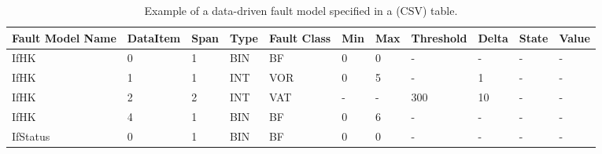 \begin{table}[h]
\begin{center}
\small
\begin{tabular}{|p{1cm}|p{1.6cm}|p{1cm}|p{1cm}|p{1cm}|p{1cm}|p{1cm}|p{1.6cm}|p{1cm}|p{1cm}|p{1cm}|}
\hline
\textbf{Fault Model Name}&\textbf{DataItem}&\textbf{Span}&\textbf{Type}&\textbf{Fault Class}&\textbf{Min}&\textbf{Max}&\textbf{Threshold}&\textbf{Delta}&\textbf{State}&\textbf{Value}\\
\hline
IfHK&0&1&BIN&BF&0&0&-&-&-&-\\
IfHK&1&1&INT&VOR&0&5&-&1&-&-\\
IfHK&2&2&INT&VAT&-&-&300&10&-&-\\
IfHK&4&1&BIN&BF&0&6&-&-&-&-\\
\hline
IfStatus&0&1&BIN&BF&0&0&-&-&-&-\\
\hline
\end{tabular}
\end{center}
\caption{Example of a data-driven fault model specified in a (CSV) table.}
\label{table:faultModel:example}
\end{table}%
